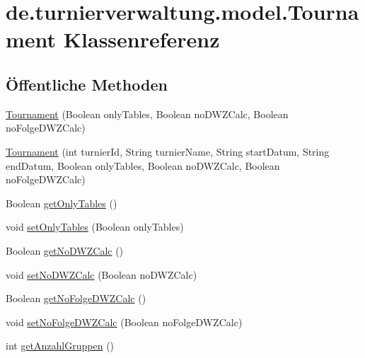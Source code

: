 \hypertarget{classde_1_1turnierverwaltung_1_1model_1_1_tournament}{}\section{de.\+turnierverwaltung.\+model.\+Tournament Klassenreferenz}
\label{classde_1_1turnierverwaltung_1_1model_1_1_tournament}
\subsection*{Öffentliche Methoden}
\begin{DoxyCompactItemize}
\item 
\hyperlink{classde_1_1turnierverwaltung_1_1model_1_1_tournament_a9287588b93499b6144c874abf5577f64}{Tournament} (Boolean only\+Tables, Boolean no\+D\+W\+Z\+Calc, Boolean no\+Folge\+D\+W\+Z\+Calc)
\item 
\hyperlink{classde_1_1turnierverwaltung_1_1model_1_1_tournament_a404083628a90d5214045da685599b6ae}{Tournament} (int turnier\+Id, String turnier\+Name, String start\+Datum, String end\+Datum, Boolean only\+Tables, Boolean no\+D\+W\+Z\+Calc, Boolean no\+Folge\+D\+W\+Z\+Calc)
\item 
Boolean \hyperlink{classde_1_1turnierverwaltung_1_1model_1_1_tournament_a08fb61eed866a9f5010cc0521500e1f6}{get\+Only\+Tables} ()
\item 
void \hyperlink{classde_1_1turnierverwaltung_1_1model_1_1_tournament_a01525415c4aaef4bd3f96ba771b7ec9f}{set\+Only\+Tables} (Boolean only\+Tables)
\item 
Boolean \hyperlink{classde_1_1turnierverwaltung_1_1model_1_1_tournament_a04a81c146fe8e5ec07e80d21a9605712}{get\+No\+D\+W\+Z\+Calc} ()
\item 
void \hyperlink{classde_1_1turnierverwaltung_1_1model_1_1_tournament_a6204f99b1ac0aa1b96f637cb111d3c16}{set\+No\+D\+W\+Z\+Calc} (Boolean no\+D\+W\+Z\+Calc)
\item 
Boolean \hyperlink{classde_1_1turnierverwaltung_1_1model_1_1_tournament_a6159d57a989a80fe241f26a262dfb56e}{get\+No\+Folge\+D\+W\+Z\+Calc} ()
\item 
void \hyperlink{classde_1_1turnierverwaltung_1_1model_1_1_tournament_aa24c0c1f1806313d6a53149dac23c6ee}{set\+No\+Folge\+D\+W\+Z\+Calc} (Boolean no\+Folge\+D\+W\+Z\+Calc)
\item 
int \hyperlink{classde_1_1turnierverwaltung_1_1model_1_1_tournament_acbfa31d8114b7c7507aeb4e4e368deab}{get\+Anzahl\+Gruppen} ()

\end{DoxyCompactItemize}
